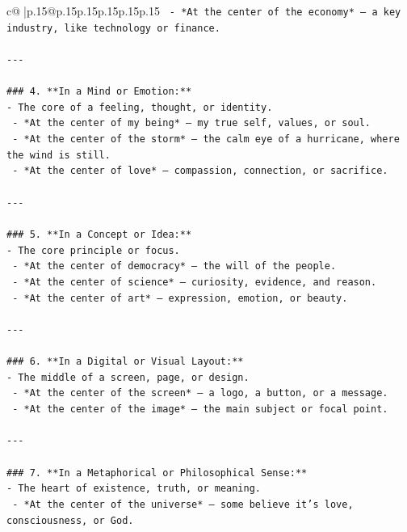 \documentclass{article}
\begin{document}
{\begin{supertabular}{c@{$\;$}|p{.15\linewidth}@{}p{.15\linewidth}p{.15\linewidth}p{.15\linewidth}p{.15\linewidth}p{.15\linewidth}}
{{{\texttt{  {-} *At the center of the economy* — a key industry, like technology or finance.} \\
\\ 
\texttt{{-}{-}{-}} \\
\\ 
\texttt{\#\#\# 4. **In a Mind or Emotion:**} \\
\texttt{{-} The core of a feeling, thought, or identity.} \\
\texttt{  {-} *At the center of my being* — my true self, values, or soul.} \\
\texttt{  {-} *At the center of the storm* — the calm eye of a hurricane, where the wind is still.} \\
\texttt{  {-} *At the center of love* — compassion, connection, or sacrifice.} \\
\\ 
\texttt{{-}{-}{-}} \\
\\ 
\texttt{\#\#\# 5. **In a Concept or Idea:**} \\
\texttt{{-} The core principle or focus.} \\
\texttt{  {-} *At the center of democracy* — the will of the people.} \\
\texttt{  {-} *At the center of science* — curiosity, evidence, and reason.} \\
\texttt{  {-} *At the center of art* — expression, emotion, or beauty.} \\
\\ 
\texttt{{-}{-}{-}} \\
\\ 
\texttt{\#\#\# 6. **In a Digital or Visual Layout:**} \\
\texttt{{-} The middle of a screen, page, or design.} \\
\texttt{  {-} *At the center of the screen* — a logo, a button, or a message.} \\
\texttt{  {-} *At the center of the image* — the main subject or focal point.} \\
\\ 
\texttt{{-}{-}{-}} \\
\\ 
\texttt{\#\#\# 7. **In a Metaphorical or Philosophical Sense:**} \\
\texttt{{-} The heart of existence, truth, or meaning.} \\
\texttt{  {-} *At the center of the universe* — some believe it’s love, consciousness, or God.} \\
}}}
\end{supertabular}}
\end{document}

